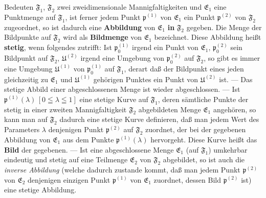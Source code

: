 \documentclass{article}
\begin{document}
Bedeuten $\mathfrak{F}_1$, $\mathfrak{F}_2$ zwei zweidimensionale Mannigfaltigkeiten und $\mathfrak{E}_1$ eine Punktmenge auf $\mathfrak{F}_1$, ist ferner jedem Punkt $\mathfrak{p}^{(1)}$ von $\mathfrak{E}_1$ ein Punkt $\mathfrak{p}^{(2)}$ von $\mathfrak{F}_2$ zugeordnet, so ist dadurch eine \textbf{Abbildung} von $\mathfrak{E}_1$ \textbf{in} $\mathfrak{F}_2$ gegeben. Die Menge der Bildpunkte auf $\mathfrak{F}_2$ wird als \textbf{Bildmenge} von $\mathfrak{E}_1$ bezeichnet. Diese Abbildung heißt \textbf{stetig}, wenn folgendes zutrifft: Ist $\mathfrak{p}_0^{(1)}$ irgend ein Punkt von $\mathfrak{E}_1$, $\mathfrak{p}_0^{(2)}$ sein Bildpunkt auf $\mathfrak{F}_2$, $\mathfrak{U}^{(2)}$ irgend eine Umgebung von $\mathfrak{p}_0^{(2)}$ auf $\mathfrak{F}_2$, so gibt es immer eine Umgebung $\mathfrak{U}^{(1)}$ von $\mathfrak{p}_0^{(1)}$ auf $\mathfrak{F}_1$, derart daß der Bildpunkt eines jeden gleichzeitig zu $\mathfrak{E}_1$ und $\mathfrak{U}^{(1)}$ gehörigen Punktes ein Punkt von $\mathfrak{U}^{(2)}$ ist. --- Das stetige Abbild einer abgeschlossenen Menge ist wieder abgeschlossen. --- Ist $\mathfrak{p}^{(1)}(\lambda)\,[0 \leqq \lambda \leqq 1]$ eine stetige Kurve auf $\mathfrak{F}_1$, deren sämtliche Punkte der stetig in einer zweiten Mannigfaltigkeit $\mathfrak{F}_2$ abgebildeten Menge $\mathfrak{E}_1$ angehören, so kann man auf $\mathfrak{F}_2$ dadurch eine stetige Kurve definieren, daß man jedem Wert des Parameters $\lambda$ denjenigen Punkt $\mathfrak{p}^{(2)}$ auf $\mathfrak{F}_2$ zuordnet, der bei der gegebenen Abbildung von $\mathfrak{E}_1$ aus dem Punkte $\mathfrak{p}^{(1)}(\lambda)$ hervorgeht. Diese Kurve heißt das \textbf{Bild} der gegebenen. --- Ist eine abgeschlossene Menge $\mathfrak{E}_1$ (auf $\mathfrak{F}_1$) umkehrbar eindeutig und stetig auf eine Teilmenge $\mathfrak{E}_2$ von $\mathfrak{F}_2$ abgebildet, so ist auch die \emph{inverse Abbildung} (welche dadurch zustande kommt, daß man jedem Punkt $\mathfrak{p}^{(2)}$ von $\mathfrak{E}_2$ denjenigen einzigen Punkt $\mathfrak{p}^{(1)}$ von $\mathfrak{E}_1$ zuordnet, dessen Bild $\mathfrak{p}^{(2)}$ ist) eine stetige Abbildung.
\end{document}
